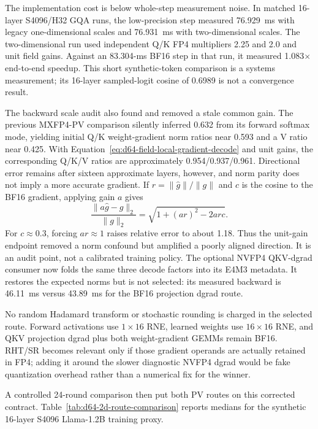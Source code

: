 The implementation cost is below whole-step measurement noise.  In matched
16-layer S4096/H32 GQA runs, the low-precision step measured 76.929~ms with
legacy one-dimensional scales and 76.931~ms with two-dimensional scales.  The
two-dimensional run used independent Q/K FP4 multipliers 2.25 and 2.0 and
unit field gains.  Against an 83.304-ms BF16 step in that run, it measured
1.083$\times$ end-to-end speedup.  This short synthetic-token comparison is a
systems measurement; its 16-layer sampled-logit cosine of 0.6989 is not a
convergence result.

The backward scale audit also found and removed a stale common gain.  The
previous MXFP4-PV comparison silently inferred 0.632 from its forward softmax
mode, yielding initial Q/K weight-gradient norm ratios near 0.593 and a V
ratio near 0.425.  With Equation~\ref{eq:d64-field-local-gradient-decode} and
unit gains, the corresponding Q/K/V ratios are approximately
0.954/0.937/0.961.  Directional error remains after sixteen approximate
layers, however, and norm parity does not imply a more accurate gradient.  If
$r=\lVert\widehat g\rVert/\lVert g\rVert$ and $c$ is the cosine to the BF16
gradient, applying gain $a$ gives
\begin{equation}
  \frac{\lVert a\widehat g-g\rVert_2}{\lVert g\rVert_2}
  = \sqrt{1+(ar)^2-2arc}.
  \label{eq:gain-direction-error}
\end{equation}
For $c\approx0.3$, forcing $ar\approx1$ raises relative error to about 1.18.
Thus the unit-gain endpoint removed a norm confound but amplified a poorly
aligned direction.  It is an audit point, not a calibrated training policy.
The optional NVFP4 QKV-dgrad consumer now folds the same three decode factors
into its E4M3 metadata.  It restores the expected norms but is not selected:
its measured backward is 46.11~ms versus 43.89~ms for the BF16 projection
dgrad route.

No random Hadamard transform or stochastic rounding is charged in the
selected route.  Forward activations use $1\times16$ RNE, learned weights use
$16\times16$ RNE, and QKV projection dgrad plus both weight-gradient GEMMs
remain BF16.  RHT/SR becomes relevant only if those gradient operands are
actually retained in FP4; adding it around the slower diagnostic NVFP4 dgrad
would be fake quantization overhead rather than a numerical fix for the
winner.

A controlled 24-round comparison then put both PV routes on this corrected
contract.  Table~\ref{tab:d64-2d-route-comparison} reports medians for the
synthetic 16-layer S4096 Llama-1.2B training proxy.

